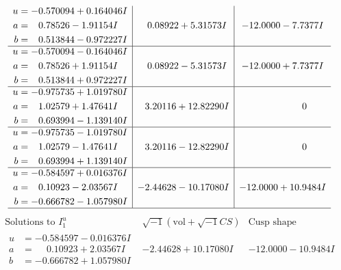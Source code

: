 \documentclass[1p]{elsarticle_modified}
\theoremstyle{definition}
\newcommand{\I}{\sqrt{-1}}
\begin{document}
$$\begin{array}{c|c|c}
\begin{aligned}
u &= -0.570094 + 0.164046 I \\
a &= \phantom{-}0.78526 - 1.91154 I \\
b &= \phantom{-}0.513844 - 0.972227 I\end{aligned}
 & \phantom{-}0.08922 + 5.31573 I & -12.0000 - 7.7377 I \\ \hline\begin{aligned}
u &= -0.570094 - 0.164046 I \\
a &= \phantom{-}0.78526 + 1.91154 I \\
b &= \phantom{-}0.513844 + 0.972227 I\end{aligned}
 & \phantom{-}0.08922 - 5.31573 I & -12.0000 + 7.7377 I \\ \hline\begin{aligned}
u &= -0.975735 + 1.019780 I \\
a &= \phantom{-}1.02579 + 1.47641 I \\
b &= \phantom{-}0.693994 - 1.139140 I\end{aligned}
 & \phantom{-}3.20116 + 12.82290 I & \phantom{-0.000000 } 0 \\ \hline\begin{aligned}
u &= -0.975735 - 1.019780 I \\
a &= \phantom{-}1.02579 - 1.47641 I \\
b &= \phantom{-}0.693994 + 1.139140 I\end{aligned}
 & \phantom{-}3.20116 - 12.82290 I & \phantom{-0.000000 } 0 \\ \hline\begin{aligned}
u &= -0.584597 + 0.016376 I \\
a &= \phantom{-}0.10923 - 2.03567 I \\
b &= -0.666782 - 1.057980 I\end{aligned}
 & -2.44628 - 10.17080 I & -12.0000 + 10.9484 I\\
 \hline 
 \end{array}$$\newpage$$\begin{array}{c|c|c}  
\text{Solutions to }I^u_{1}& \I (\text{vol} + \sqrt{-1}CS) & \text{Cusp shape}\\
 \hline 
\begin{aligned}
u &= -0.584597 - 0.016376 I \\
a &= \phantom{-}0.10923 + 2.03567 I \\
b &= -0.666782 + 1.057980 I\end{aligned}
 & -2.44628 + 10.17080 I & -12.0000 - 10.9484 I \\ \hline\begin{aligned}

\end{aligned}
\end{array}$$
\end{document}
